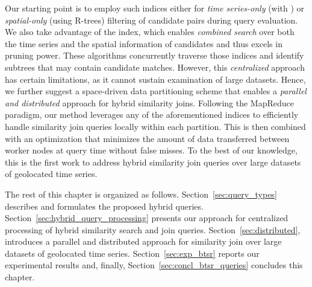 Our starting point is to employ such indices either for {\em time series-only} (with \isax) or {\em spatial-only} (using R-trees) filtering of candidate pairs during query evaluation. We also take advantage of the \btsr index, which enables {\em combined search} over both the time series and the spatial information of candidates and thus excels in pruning power. These algorithms concurrently traverse those indices and identify subtrees that may contain candidate matches. However, this {\em centralized} approach has certain limitations, as it cannot sustain examination of large datasets. Hence, we further suggest a space-driven data partitioning scheme that enables a {\em parallel and distributed} approach for hybrid similarity joins. Following the MapReduce paradigm, our method leverages any of the aforementioned indices to efficiently handle similarity join queries locally within each partition. This is then combined with an optimization that minimizes the amount of data transferred between worker nodes at query time without false misses. To the best of our knowledge, this is the first work to address hybrid similarity join queries over large datasets of geolocated time series.

The rest of this chapter is organized as follows. Section~\ref{sec:query_types} describes and formulates the proposed hybrid queries. Section~\ref{sec:hybrid_query_processing} presents our approach for centralized processing of hybrid similarity search and join queries. Section~\ref{sec:distributed}, introduces a parallel and distributed approach for similarity join over large datasets of geolocated time series. Section~\ref{sec:exp_btsr} reports our experimental results and, finally, Section~\ref{sec:concl_btsr_queries} concludes this chapter.